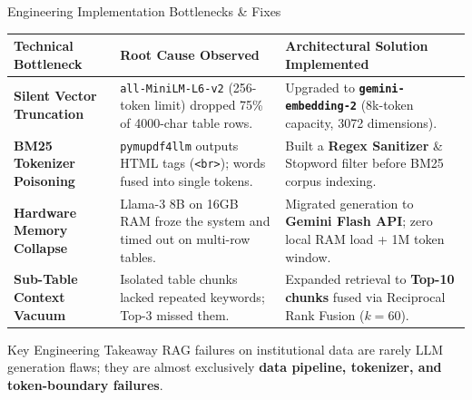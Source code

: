 \documentclass[11pt]{beamer}
\begin{document}
\begin{frame}{Engineering Implementation Bottlenecks \& Fixes}
    \begin{table}[h]
    \centering
    \scriptsize
    \begin{tabular}{@{}p{2.6cm}p{3.8cm}p{4.2cm}@{}}
        \toprule
        \textbf{Technical Bottleneck} & \textbf{Root Cause Observed} & \textbf{Architectural Solution Implemented}\\
        \midrule
        \textbf{Silent Vector Truncation} & \texttt{all-MiniLM-L6-v2} (256-token limit) dropped 75\% of 4000-char table rows. & Upgraded to \textbf{\texttt{gemini-embedding-2}} (8k-token capacity, 3072 dimensions).\\[4pt]
        \textbf{BM25 Tokenizer Poisoning} & \texttt{pymupdf4llm} outputs HTML tags (\texttt{<br>}); words fused into single tokens. & Built a \textbf{Regex Sanitizer} \& Stopword filter before BM25 corpus indexing.\\[4pt]
        \textbf{Hardware Memory Collapse} & Llama-3 8B on 16GB RAM froze the system and timed out on multi-row tables. & Migrated generation to \textbf{Gemini Flash API}; zero local RAM load + 1M token window.\\[4pt]
        \textbf{Sub-Table Context Vacuum} & Isolated table chunks lacked repeated keywords; Top-3 missed them. & Expanded retrieval to \textbf{Top-10 chunks} fused via Reciprocal Rank Fusion ($k=60$).\\
        \bottomrule
    \end{tabular}
    \end{table}
    \vspace{2pt}
    \begin{block}{Key Engineering Takeaway}
        RAG failures on institutional data are rarely LLM generation flaws; they are almost exclusively \textbf{data pipeline, tokenizer, and token-boundary failures}.
    \end{block}
\end{frame}
\end{document}
